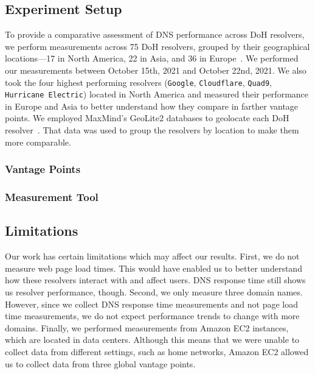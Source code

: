 \subsection{Experiment Setup}
To provide a comparative assessment of DNS performance across DoH resolvers, we perform measurements across 75 DoH resolvers, grouped by their geographical locations—17 in North America, 22 in Asia, and 36 in Europe~\cite{dnscrypt}.
We performed our measurements between October 15th, 2021 and October 22nd, 2021.
We also took the four highest performing resolvers (\texttt{Google}, \texttt{Cloudflare}, \texttt{Quad9}, \texttt{Hurricane Electric}) located in North America and measured their performance in Europe and Asia to better understand how they compare in farther vantage points.  
We employed MaxMind's GeoLite2 databases to geolocate each DoH resolver~\cite{maxmind}.
That data was used to group the resolvers by location to make them more comparable. 

\subsubsection{Vantage Points}

\subsubsection{Measurement Tool}

\subsection{Limitations}
Our work has certain limitations which may affect our results. 
First, we do not measure web page load times. 
This would have enabled us to better understand how these resolvers interact with and affect users. 
DNS response time still shows us resolver performance, though. 
Second, we only measure three domain names. 
However, since we collect DNS response time measurements and not page load time measurements, we do not expect performance trends to change with more domains.
Finally, we performed measurements from Amazon EC2 instances, which are located in data centers. 
Although this means that we were unable to collect data from different settings, such as home networks, Amazon EC2 allowed us to collect data from three global vantage points. 
